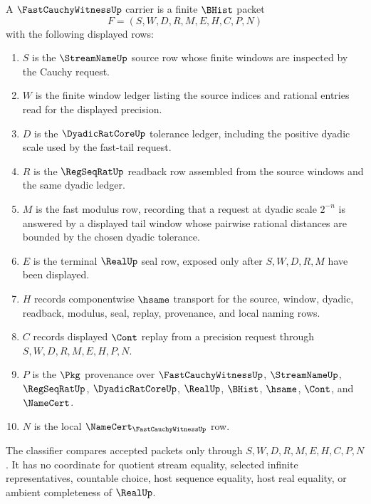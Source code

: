 \begin{definition}
\label{def:fast-cauchy-witness-carrier}
A $\FastCauchyWitnessUp$ carrier is a finite $\BHist$ packet
$$
F=(S,W,D,R,M,E,H,C,P,N)
$$
with the following displayed rows:
\begin{enumerate}
\item $S$ is the $\StreamNameUp$ source row whose finite windows are inspected by the Cauchy request.
\item $W$ is the finite window ledger listing the source indices and rational entries read for the displayed precision.
\item $D$ is the $\DyadicRatCoreUp$ tolerance ledger, including the positive dyadic scale used by the fast-tail request.
\item $R$ is the $\RegSeqRatUp$ readback row assembled from the source windows and the same dyadic ledger.
\item $M$ is the fast modulus row, recording that a request at dyadic scale $2^{-n}$ is answered by a displayed tail window whose pairwise rational distances are bounded by the chosen dyadic tolerance.
\item $E$ is the terminal $\RealUp$ seal row, exposed only after $S,W,D,R,M$ have been displayed.
\item $H$ records componentwise $\hsame$ transport for the source, window, dyadic, readback, modulus, seal, replay, provenance, and local naming rows.
\item $C$ records displayed $\Cont$ replay from a precision request through $S,W,D,R,M,E,H,P,N$.
\item $P$ is the $\Pkg$ provenance over $\FastCauchyWitnessUp$, $\StreamNameUp$, $\RegSeqRatUp$, $\DyadicRatCoreUp$, $\RealUp$, $\BHist$, $\hsame$, $\Cont$, and $\NameCert$.
\item $N$ is the local $\NameCert_{\FastCauchyWitnessUp}$ row.
\end{enumerate}
The classifier compares accepted packets only through $S,W,D,R,M,E,H,C,P,N$. It has no coordinate for quotient stream equality, selected infinite representatives, countable choice, host sequence equality, host real equality, or ambient completeness of $\RealUp$.
\end{definition}

